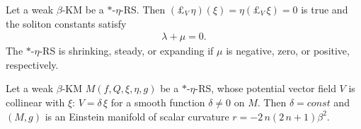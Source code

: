 \documentclass[10pt,a4paper]{amsart}
\begin{document}
\begin{proposition}\label{T-lambda0}
Let a weak $\beta$-KM be a $\ast$-$\eta$-RS.
Then $(\pounds_V\,\eta)(\xi) = \eta(\pounds_V\,\xi) = 0$ is true
and the soliton constants satisfy
\begin{align}\label{E-3.21b}
 \lambda +\mu = 0.
\end{align}
The $\ast$-$\eta$-RS is shrinking, steady, or expanding
if $\mu$ is negative, zero, or positive, respectively.
\end{proposition}

\begin{theorem}\label{T-004}
Let a weak $\beta$-KM $M({f},Q,\xi,\eta,g)$ be a $\ast$-$\eta$-RS, whose potential vector field $V$ is collinear with $\xi$:
$V=\delta\,\xi$ for a smooth function $\delta\ne0$ on $M$. Then $\delta=const$ and $(M, g)$ is an
Einstein manifold of scalar curvature ${r}=-2\,n(2\,n+1)\beta^2$.
\end{theorem}
\end{document}
